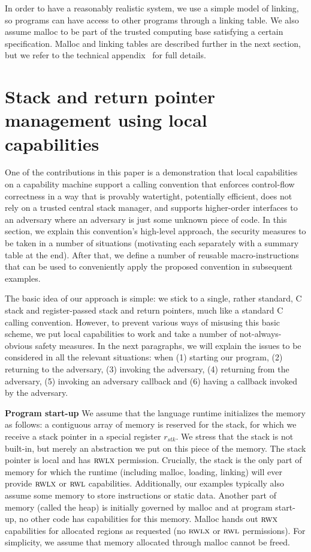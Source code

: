 \documentclass[acmsmall,review]{acmart}\settopmatter{printfolios=true}
\newcommand{\var}[1]{\mathit{#1}}
\newcommand{\stk}{\var{stk}}
\newcommand{\plainperm}[1]{\textsc{#1}}
\newcommand{\rwx}{\plainperm{rwx}}
\newcommand{\readwritel}{\plainperm{rwl}}
\newcommand{\rwl}{\readwritel}
\newcommand{\rwlx}{\plainperm{rwlx}}
\begin{document}

In order to have a reasonably realistic system, we use a simple model of
linking, so programs can have access to other programs through a linking table.
We also assume malloc to be part of the trusted computing base satisfying a
certain specification. Malloc and linking tables are described further in the
next section, but we refer to the technical appendix~\citep{technical_appendix}
for full details.

\section{Stack and return pointer management using local capabilities}
\label{sec:stack-and-return-pointer}
One of the contributions in this paper is a demonstration that local
capabilities on a capability machine support a calling convention that enforces
control-flow correctness in a way that is provably watertight, potentially
efficient, does not rely on a trusted central stack manager, and supports
higher-order interfaces to an adversary where an adversary is just some unknown piece of code. In this section, we explain this
convention's high-level approach, the security measures to be taken in a number
of situations (motivating each separately with a summary table at the end).
After that, we define a number of reusable macro-instructions that can be used
to conveniently apply the proposed convention in subsequent examples.

The basic idea of our approach is simple: we stick to a single, rather standard,
C stack and register-passed stack and return pointers, much like a standard C
calling convention. However, to prevent various ways of misusing this basic
scheme, we put local capabilities to work and take a number of
not-always-obvious safety measures. In the next paragraphs, we will explain the
issues to be considered in all the relevant situations: when (1) starting our
program, (2) returning to the adversary, (3) invoking the adversary, (4)
returning from the adversary, (5) invoking an adversary callback and (6) having
a callback invoked by the adversary.

\textbf{Program start-up} We assume that the language runtime initializes the
memory as follows: a contiguous array of memory is reserved for the stack, for
which we receive a stack pointer in a special register $r_\stk$. We stress that
the stack is not built-in, but merely an abstraction we put on this piece of the
memory. The stack pointer is local and has $\rwlx$ permission. Crucially, the
stack is the only part of memory for which the runtime (including malloc,
loading, linking) will ever provide $\rwlx$ or $\rwl$ capabilities.
Additionally, our examples typically also assume some memory to store
instructions or static data. Another part of memory (called the heap) is
initially governed by malloc and at program start-up, no other code has
capabilities for this memory. Malloc hands out $\rwx$ capabilities for allocated
regions as requested (no $\rwlx$ or $\rwl$ permissions). For simplicity, we
assume that memory allocated through malloc cannot be freed.
\end{document}
